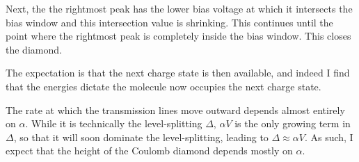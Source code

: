 Next, the the rightmost peak has the lower bias voltage at which it intersects the bias window and this intersection value is shrinking. This continues until the point where the rightmost peak is completely inside the bias window. This closes the diamond. 

The expectation is that the next charge state is then available, and indeed I find that the energies dictate the molecule now occupies the next charge state.

The rate at which the transmission lines move outward depends almost entirely on $\alpha$. While it is technically the level-splitting $\Delta$, $\alpha V$ is the only growing term in $\Delta$, so that it will soon dominate the level-splitting, leading to $\Delta \approx \alpha V$. As such, I expect that the height of the Coulomb diamond depends mostly on $\alpha$. 

